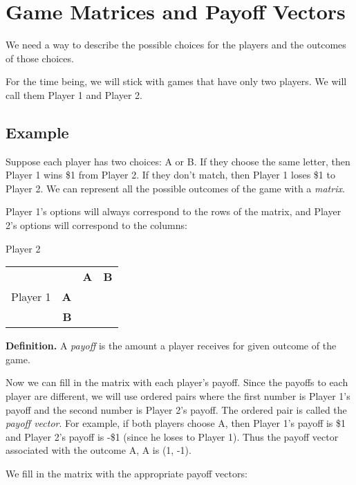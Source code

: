 \section{Game Matrices and Payoff Vectors}


\vspace{.2in}

We need a way to describe the possible choices for the players and the outcomes of those choices.

For the time being, we will stick with games that have only two players. We will call them Player 1 and Player 2.

\subsection*{Example}

Suppose each player has two choices: A or B. If they choose the same letter, then Player 1 wins \$1 from Player 2. If they don't match, then Player 1 loses \$1 to Player 2. We can represent all the possible outcomes of the game with a {\it matrix}.  

Player 1's options will always correspond to the rows of the matrix, and Player 2's options will correspond to the columns:

\hspace{1in}Player 2

\begin{tabular}{l|r|c|c|}\cline{2-4}
&&\textbf{A}&\textbf{B}\\ \cline{2-4}
Player 1&\textbf{A} &&\\ \cline{2-4}
&\textbf{B} &&\\ \cline{2-4}

\end{tabular}
\medskip

{\bf Definition.} A {\it payoff} is the amount a player receives for  given outcome of the game.

Now we can fill in the matrix with each player's payoff. Since the payoffs to each player are different, we will use ordered pairs where the first number is Player 1's payoff and the second number is Player 2's payoff. The ordered pair is called the {\it payoff vector}. For example, if both players choose A, then Player 1's payoff is \$1 and Player 2's payoff is -\$1 (since he loses to Player 1). Thus the payoff vector associated with the outcome A, A is (1, -1). 

We fill in the matrix with the appropriate payoff vectors:

